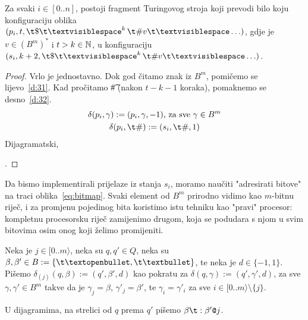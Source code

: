 \begin{lema}[{name=[{treći fragment transpiliranog stroja, priprema za instrukciju}]}]\label{lm:pi>si}
Za svaki $i\in[0..n]$, postoji fragment Turingovog stroja koji prevodi bilo koju konfiguraciju oblika $(p_i,t,\t\$\bl^k\,\t\#v\bl\ldots)$, gdje je $v\in(B^m)^*$ i $t>k\in{\mathbb N}$, u konfiguraciju $(s_i,k+2,\t\$\bl^k\,\t\#v\bl\ldots)$.
\end{lema}
\begin{proof}
Vrlo je jednostavno. Dok god čitamo znak iz $B^m$, pomičemo se lijevo~\eqref{d:31}. Kad pročitamo \t\# (nakon $t-k-1$ koraka), pomaknemo se desno~\eqref{d:32}.
\begin{gather}
\label{d:31}
    \delta(p_i,\gamma):=(p_i,\gamma,-1)\text{, za sve }\gamma\in B^m\\
\label{d:32}
    \delta(p_i,\t\#):=(s_i,\t\#,1)
\end{gather}
Dijagramatski,
\;.
\end{proof}


Da bismo implementirali prijelaze iz stanja $s_i$, moramo naučiti "adresirati bitove" na traci oblika~\eqref{eq:bitmap}. Svaki element od $B^m$ prirodno vidimo kao $m$-bitnu riječ, i za promjenu pojedinog bita koristimo istu tehniku kao "pravi" procesor: kompletnu procesorsku riječ zamijenimo drugom, koja se podudara s njom u svim bitovima osim onog koji želimo promijeniti.

\begin{definicija}[{name=[funkcija prijelaza u određenom tragu]}]\label{def:trag}
Neka je $j\in[0..m\rangle$, neka su $q,q'\in Q$, neka su $\beta,\beta'\in B:=\{\t\textopenbullet,\t\textbullet\}$, te neka je $d\in\{-1,1\}$. Pišemo $\delta_{(j)}(q,\beta):=(q',\beta',d)$ kao pokratu za
$\delta(q,\gamma):=(q',\gamma',d)$\text,
za sve $\gamma,\gamma'\in B^m$ takve da je $\gamma_j=\beta$, $\gamma'_j=\beta'$, te $\gamma_i=\gamma'_i$ za sve $i\in[0..m\rangle\setminus\{j\}$.

U dijagramima, na strelici od $q$ prema $q'$ pišemo $\beta\t:\beta'\texttt@j$.
\end{definicija}

